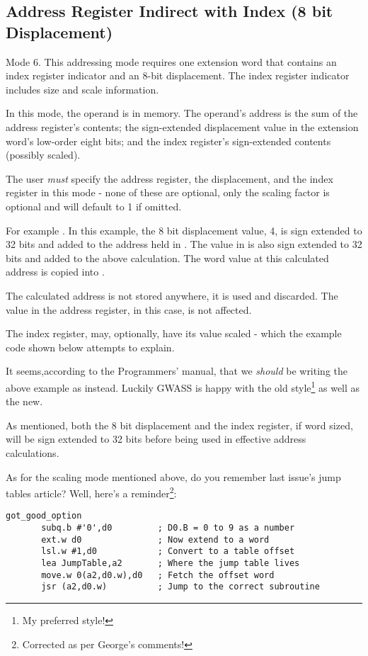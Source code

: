 \subsection{Address Register Indirect with Index (8 bit Displacement)}\label{sub-ARegII8}
Mode 6. This addressing mode requires one extension word that contains an index register indicator and an 8-bit displacement. The index register indicator includes size and scale information.

In this mode, the operand is in memory. The operand’s address is the sum of the address
register’s contents; the sign-extended displacement value in the extension word’s low-order eight bits; and the index register’s sign-extended contents (possibly scaled). 

The user \emph{must} specify the address register, the displacement, and the index register in this mode - none of these are optional, only the scaling factor is optional and will default to 1 if omitted.

For example . In this example, the 8 bit displacement value, 4, is sign extended to 32 bits and added to the address held in . The value in  is also sign extended to 32 bits and added to the above calculation. The word value at this calculated address is copied into .

The calculated address is not stored anywhere, it is used and discarded. The value in the address register,  in this case, is not affected.

The index register,  may, optionally, have its value scaled - which the example code shown below attempts to explain.

It seems,according to the Programmers' manual, that we \emph{should} be writing the above example as  instead. Luckily GWASS is happy with the old style\footnote{My preferred style!} as well as the new.

As mentioned, both the 8 bit displacement and the index register, if word sized, will be sign extended to 32 bits before being used in effective address calculations.

As for the scaling mode mentioned above, do you remember last issue's jump tables article? Well, here's a reminder\footnote{Corrected as per George's comments!}:

\begin{lstlisting}[firstnumber=1,caption={Jump Table - Old Style}]
got_good_option
       subq.b #'0',d0         ; D0.B = 0 to 9 as a number
       ext.w d0               ; Now extend to a word
       lsl.w #1,d0            ; Convert to a table offset
       lea JumpTable,a2       ; Where the jump table lives
       move.w 0(a2,d0.w),d0   ; Fetch the offset word
       jsr (a2,d0.w)          ; Jump to the correct subroutine
\end{lstlisting}       
       
